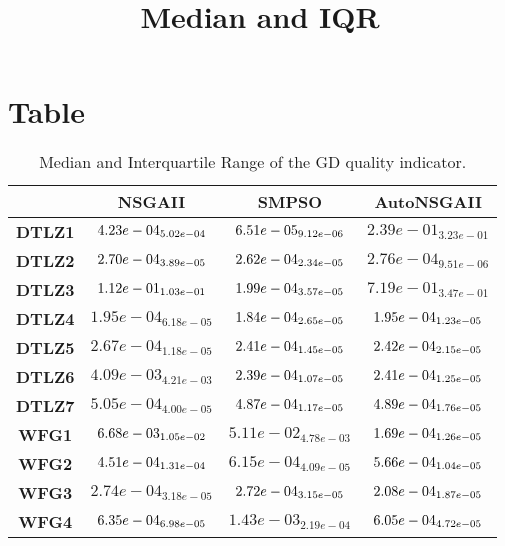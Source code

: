 \documentclass{article}
\title{Median and IQR}
\author{}
\begin{document}
\maketitle
\section{Table}
\begin{table}[!htp]
  \caption{Median and Interquartile Range of the GD quality indicator.}
  \label{table:GD}
  \centering
  \begin{scriptsize}
  \begin{tabular}{c|ccc}
      & \textbf{NSGAII} & \textbf{SMPSO} & \textbf{AutoNSGAII} \\\hline
      \textbf{DTLZ1} & $\cellcolor{gray25} 4.23e-04_{5.02e-04} $ & $ \cellcolor{gray95} 6.51e-05_{9.12e-06} $ & $ 2.39e-01_{3.23e-01}$ \\
      \textbf{DTLZ2} & $\cellcolor{gray25} 2.70e-04_{3.89e-05} $ & $ \cellcolor{gray95} 2.62e-04_{2.34e-05} $ & $ 2.76e-04_{9.51e-06}$ \\
      \textbf{DTLZ3} & $\cellcolor{gray25} 1.12e-01_{1.03e-01} $ & $ \cellcolor{gray95} 1.99e-04_{3.57e-05} $ & $ 7.19e-01_{3.47e-01}$ \\
      \textbf{DTLZ4} & $1.95e-04_{6.18e-05} $ & $ \cellcolor{gray95} 1.84e-04_{2.65e-05} $ & $ \cellcolor{gray25} 1.95e-04_{1.23e-05}$ \\
      \textbf{DTLZ5} & $2.67e-04_{1.18e-05} $ & $ \cellcolor{gray95} 2.41e-04_{1.45e-05} $ & $ \cellcolor{gray25} 2.42e-04_{2.15e-05}$ \\
      \textbf{DTLZ6} & $4.09e-03_{4.21e-03} $ & $ \cellcolor{gray95} 2.39e-04_{1.07e-05} $ & $ \cellcolor{gray25} 2.41e-04_{1.25e-05}$ \\
      \textbf{DTLZ7} & $5.05e-04_{4.00e-05} $ & $ \cellcolor{gray95} 4.87e-04_{1.17e-05} $ & $ \cellcolor{gray25} 4.89e-04_{1.76e-05}$ \\
      \textbf{WFG1} & $\cellcolor{gray25} 6.68e-03_{1.05e-02} $ & $ 5.11e-02_{4.78e-03} $ & $ \cellcolor{gray95} 1.69e-04_{1.26e-05}$ \\
      \textbf{WFG2} & $\cellcolor{gray95} 4.51e-04_{1.31e-04} $ & $ 6.15e-04_{4.09e-05} $ & $ \cellcolor{gray25} 5.66e-04_{1.04e-05}$ \\
      \textbf{WFG3} & $2.74e-04_{3.18e-05} $ & $ \cellcolor{gray25} 2.72e-04_{3.15e-05} $ & $ \cellcolor{gray95} 2.08e-04_{1.87e-05}$ \\
      \textbf{WFG4} & $\cellcolor{gray25} 6.35e-04_{6.98e-05} $ & $ 1.43e-03_{2.19e-04} $ & $ \cellcolor{gray95} 6.05e-04_{4.72e-05}$ \\

\end{tabular}
\end{scriptsize}
\end{table}
\end{document}
